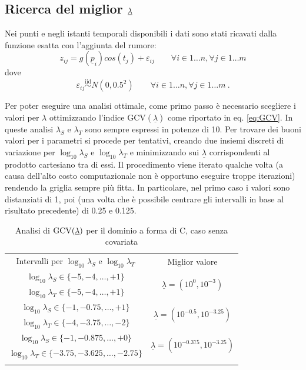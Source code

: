 \documentclass[a4paper,11pt,twoside,openright]{book}							%
\begin{document}
\subsection{Ricerca del miglior $\protect\underline{\lambda}$}
Nei punti e negli istanti temporali disponibili i dati sono stati ricavati dalla funzione esatta con l'aggiunta del rumore:
$$
z_{ij}=g(\underline p_{i})cos(t_j) + \varepsilon_{ij} \qquad \forall i \in 1\ldots n, \forall j \in 1\ldots m
$$
dove
$$
\varepsilon_{ij}\stackrel{\mathrm{iid}}{\sim}N(0,0.5^2) \qquad \forall i \in 1\ldots n, \forall j \in 1\ldots m \ .
$$

Per poter eseguire una analisi ottimale, come primo passo è necessario scegliere i valori per $\lambda$ ottimizzando l'indice $\mathrm{GCV}(\underline \lambda)$ come riportato in eq. \ref{eq:GCV}. In queste analisi $\lambda_S$ e $\lambda_T$ sono sempre espressi in potenze di 10. Per trovare dei buoni valori per i parametri si procede per tentativi, creando due insiemi discreti di variazione per $\log_{10}\lambda_S$ e $\log_{10}\lambda_T$ e minimizzando sui $\underline \lambda$ corrispondenti al prodotto cartesiano tra di essi. Il procedimento viene iterato qualche volta (a causa dell'alto costo computazionale non è opportuno eseguire troppe iterazioni) rendendo la griglia sempre più fitta. In particolare, nel primo caso i valori sono distanziati di 1, poi (una volta che è possibile centrare gli intervalli in base al risultato precedente) di 0.25 e 0.125.
\newline
\begin{table}[h]
\renewcommand{\arraystretch}{1.3}
\setlength{\tabcolsep}{2mm}
\centering
	\begin{tabular}{!{\vrule width 1.2pt}c!{\vrule width 1.2pt}c!{\vrule width 1.2pt}}
	Intervalli per $\log_{10}\lambda_S$ e $\log_{10}\lambda_T$& Miglior valore											\\
	$\log_{10}\lambda_S \in \{-5,-4,\ldots,+1\}$ 	&  			\\
	$\log_{10}\lambda_T \in \{-5,-4,\ldots,+1\}$		& 															\\	
	$\log_{10}\lambda_S \in \{-1,-0.75,\ldots,+1\}$ 	&  		\\
	$\log_{10}\lambda_T \in \{-4,-3.75,\ldots,-2\}$	& 															\\	
	$\log_{10}\lambda_S \in \{-1,-0.875,\ldots,+0\}$ 	& 	\\
	$\log_{10}\lambda_T \in \{-3.75,-3.625,\ldots,-2.75\}$		& 												\\	
	\end{tabular}
\caption{Analisi di $\mathrm{GCV}(\protect\underline{\lambda})$ per il dominio a forma di C, caso senza covariata}
\label{tab:DomC}
\end{table}
\end{document}
